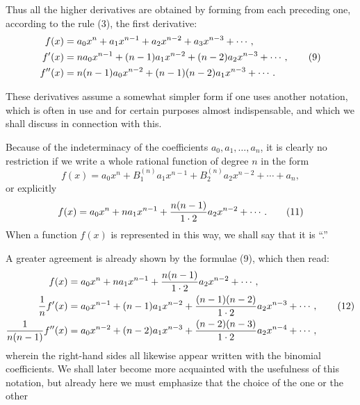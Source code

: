 

Thus all the higher derivatives are obtained by forming from each preceding one, according to the rule (3), the first derivative:
\begin{align}
 f(x)&=a_0x^n+a_1x^{n-1}+a_2x^{n-2}+a_3x^{n-3}+\cdots,\notag\\
 f'(x)&=na_0x^{n-1}+(n-1)a_1x^{n-2}+(n-2)a_2x^{n-3}+\cdots, \tag{9}\\
 f''(x)&=n(n-1)a_0x^{n-2}+(n-1)(n-2)a_1x^{n-3}+\cdots. \notag
\end{align}

These derivatives assume a somewhat simpler form if one uses another notation, which is often in use and for certain purposes almost indispensable, and which we shall discuss in connection with this.

Because of the indeterminacy of the coefficients $a_0,a_1,\ldots,a_n$, it is clearly no restriction if we write a whole rational function of degree $n$ in the form
\begin{equation}
 f(x)=a_0x^n+B_1^{(n)}a_1x^{n-1}+B_2^{(n)}a_2x^{n-2}+\cdots+a_n,
\tag{10}
\end{equation}
or explicitly
\begin{equation}
 f(x)=a_0x^n+na_1x^{n-1}+{n(n-1)\over1\cdot2}a_2x^{n-2}+\cdots.
\tag{11}
\end{equation}
When a function $f(x)$ is represented in this way, we shall say that it is ``.''

A greater agreement is already shown by the formulae (9), which then read:
\begin{align}
 f(x)&=a_0x^n+na_1x^{n-1}+{n(n-1)\over1\cdot2}a_2x^{n-2}+\cdots,\notag\\
 {1\over n}f'(x)&=a_0x^{n-1}+(n-1)a_1x^{n-2}+{(n-1)(n-2)\over1\cdot2}a_2x^{n-3}+\cdots, \tag{12}\\
 {1\over n(n-1)}f''(x)&=a_0x^{n-2}+(n-2)a_1x^{n-3}+{(n-2)(n-3)\over1\cdot2}a_2x^{n-4}+\cdots,\notag
\end{align}
wherein the right-hand sides all likewise appear written with the binomial coefficients. We shall later become more acquainted with the usefulness of this notation, but already here we must emphasize that the choice of the one or the other
